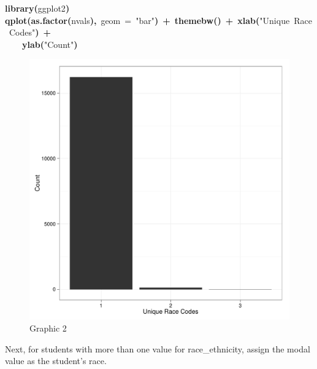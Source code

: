 \documentclass[12pt]{article}
\makeatletter
\newcommand{\hlfunctioncall}[1]{\textcolor[rgb]{0.501960784313725,0,0.329411764705882}{\textbf{#1}}}%
\newcommand{\hlstring}[1]{\textcolor[rgb]{0.6,0.6,1}{#1}}%
\newcommand{\hlkeyword}[1]{\textcolor[rgb]{0,0,0}{\textbf{#1}}}%
\newcommand{\hlargument}[1]{\textcolor[rgb]{0.690196078431373,0.250980392156863,0.0196078431372549}{#1}}%
\newcommand{\hlsymbol}[1]{\textcolor[rgb]{0,0,0}{#1}}%
\newcommand{\hlstd}[1]{\textcolor[rgb]{0,0,0}{#1}}%
\newenvironment{kframe}{%
 \def\FrameCommand##1{\hskip\@totalleftmargin \hskip-\fboxsep
 \colorbox{shadecolor}{##1}\hskip-\fboxsep
     \hskip-\linewidth \hskip-\@totalleftmargin \hskip\columnwidth}%
 \MakeFramed {\advance\hsize-\width
   \@totalleftmargin\z@ \linewidth\hsize
   \@setminipage}}%
 {\par\unskip\endMakeFramed}
\newenvironment{knitrout}{}{} %
\makeatother
\begin{document}
\begin{knitrout}
\color{fgcolor}\begin{kframe}
\begin{flushleft}
\ttfamily\noindent
\hlfunctioncall{library}\hlkeyword{(}\hlsymbol{ggplot2}\hlkeyword{)}\hspace*{\fill}\\
\hlstd{}\hlfunctioncall{qplot}\hlkeyword{(}\hlfunctioncall{as.factor}\hlkeyword{(}\hlsymbol{nvals}\hlkeyword{)}\hlkeyword{,}{\ }\hlargument{geom}{\ }\hlargument{=}{\ }\hlstring{"{}bar"{}}\hlkeyword{)}{\ }\hlkeyword{+}{\ }\hlfunctioncall{theme\usebox{\hlnormalsizeboxunderscore}bw}\hlkeyword{(}\hlkeyword{)}{\ }\hlkeyword{+}{\ }\hlfunctioncall{xlab}\hlkeyword{(}\hlstring{"{}Unique{\ }Race{\ }Codes"{}}\hlkeyword{)}{\ }\hlkeyword{+}\hspace*{\fill}\\
\hlstd{}{\ }{\ }{\ }{\ }\hlfunctioncall{ylab}\hlkeyword{(}\hlstring{"{}Count"{}}\hlkeyword{)}\mbox{}
\normalfont
\end{flushleft}
\end{kframe}\begin{figure}[]


\includegraphics[width=.75\textwidth,height=.35\paperheight]{figure/unnamed-chunk-11} \hfill{}

\caption[Graphic 2]{Graphic 2\label{fig:unnamed-chunk-11}}
\end{figure}

\end{knitrout}


Next, for students with more than one value for race\_ethnicity, assign the modal value as the student's race.
\end{document}
